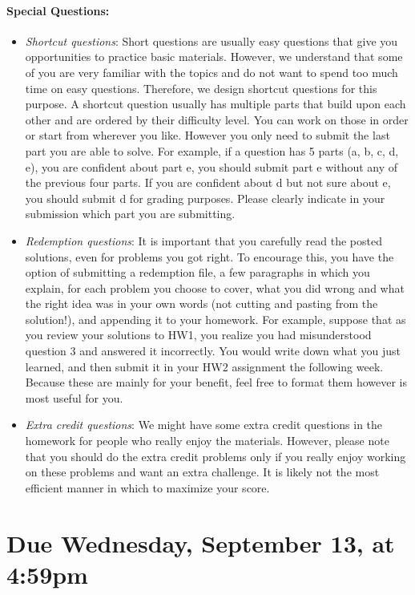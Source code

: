 \documentclass[11pt]{article}
\begin{document}
\paragraph{Special Questions:}
\begin{itemize}
\item {\em Shortcut questions}: Short questions are usually easy questions that give you opportunities to practice basic materials. However, we understand that some of you are very familiar with the topics and do not want to spend too much time on easy questions. Therefore, we design shortcut questions for this purpose. A shortcut question usually has multiple parts that build upon each other and are ordered by their difficulty level. You can work on those in order or start from wherever you like. However you only need to submit the last part you are able to solve. For example, if a question has 5 parts (a, b, c, d, e), you are confident about part e, you should submit part e without any of the previous four parts. If you are confident about d but not sure about e, you should submit d for grading purposes. Please clearly indicate in your submission which part you are submitting.
\item {\em Redemption questions}: It is important that you carefully read the posted solutions, even for problems you got right. To encourage this, you have the option of submitting a redemption file, a few paragraphs in which you explain, for each problem you choose to cover, what you did wrong and what the right idea was in your own words (not cutting and pasting from the solution!), and appending it to your homework. For example, suppose that as you review your solutions to HW1, you realize you had misunderstood question 3 and answered it incorrectly. You would write down what you just learned, and then submit it in your HW2 assignment the following week. Because these are mainly for your benefit, feel free to format them however is most useful for you.
\item {\em Extra credit questions}: We might have some extra credit questions in the homework for people who really enjoy the materials. However, please note that you should do the extra credit problems only if you really enjoy working on these problems and want an extra challenge. It is likely not the most efficient manner in which to maximize your score.
\end{itemize}

\newpage
\section*{Due Wednesday, September 13, at 4:59pm} 


\end{document}
